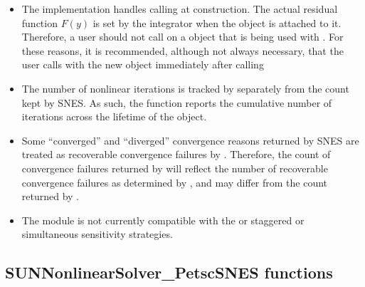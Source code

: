 \begin{itemize}
\item The {\sunnonlinsolpetsc} implementation handles calling 
at construction. The actual residual function $F(y)$ is set by the {\sundials}
integrator when the {\sunnonlinsolpetsc} object is attached to it. Therefore, a
user should not call  on a  object that is being
used with {\sunnonlinsolpetsc}. For these reasons, it is recommended, although
not always necessary, that the user calls  with the
new  object immediately after calling

\item The number of nonlinear iterations is tracked by {\sundials} separately
from the count kept by SNES. As such, the function 
reports the cumulative number of iterations across the lifetime of the
{\sunnonlinsol} object.

\item Some ``converged'' and ``diverged'' convergence reasons returned by SNES
are treated as recoverable convergence failures by {\sundials}. Therefore, the
count of convergence failures returned by  will
reflect the number of recoverable convergence failures as determined by
{\sundials}, and may differ from the count returned by
.

\item The {\sunnonlinsolpetsc} module is not currently compatible with the
{\cvodes} or {\idas} staggered or simultaneous sensitivity strategies.
\end{itemize}

\subsection{SUNNonlinearSolver\_PetscSNES functions}
\label{ss:sunnonlinsolpetsc_functions}

